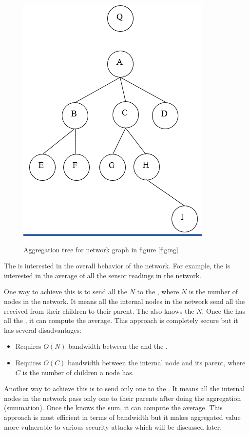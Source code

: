 		\begin{figure}[hp]
			\centering
			\includegraphics[scale = 0.6]{images/aggregation-tree.png}\\
			\caption{Aggregation tree for network graph in figure \ref{fig:ng}}
			\label{fig:at}
		\end{figure}

		The \q is interested in the overall behavior of the network. 
		For example, the \q is interested in the average of all the sensor readings in the network.
		
		One way to achieve this is to send all the $N$ \payloads to the \q, where $N$ is the number of nodes in the network.
		It means all the internal nodes in the network send all the \payloads received from their children to their parent.
		The \q also knows the $N$.
		Once the \q has all the \payloads, it can compute the average.  
		This approach is completely secure but it has several disadvantages:
		\begin{itemize}
			\item Requires $O(N)$ bandwidth between the \bs and the \q.
			\item Requires $O(C)$ bandwidth between the internal node and its parent, where $C$ is the number of children a node has.
		\end{itemize}
		
		Another way to achieve this is to send only one \payload to the \q.
		It means all the internal nodes in the network pass only one \payload to their parents after doing the aggregation (summation).
		Once the \q knows the sum, it can compute the average.
		This approach is most efficient in terms of bandwidth but it makes aggregated value more vulnerable to various security attacks which will be discussed later.

